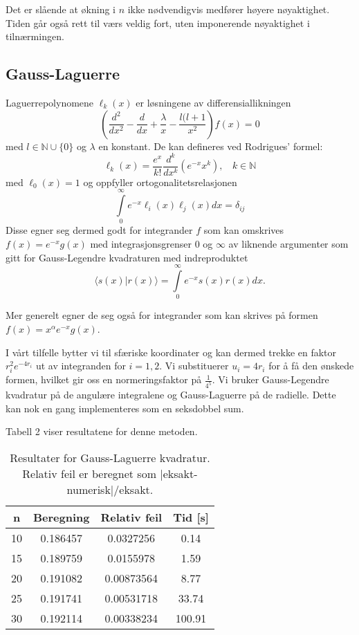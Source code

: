 \documentclass[norsk, 12pt]{article}
\newcommand{\f}{\frac}
\begin{document}
Det er slående at økning i $n$ ikke nødvendigvis medfører høyere nøyaktighet. Tiden går også rett til værs veldig fort,
uten imponerende nøyaktighet i tilnærmingen.

\subsection{Gauss-Laguerre}
Laguerrepolynomene $\ell_k(x)$ er løsningene av differensiallikningen
$$\left(\f{d^2}{dx^2}-\f{d}{dx}+\f{\lambda}{x}-\f{l(l+1}{x^2}\right)f(x)=0$$
med $l\in\mathbb{N}\cup\{0\}$ og $\lambda$ en konstant.
De kan defineres ved Rodrigues' formel:
$$\ell_k(x)=\f{e^x}{k!}\f{d^k}{dx^k}\left(e^{-x}x^k\right),\ \ \ \ k\in \mathbb{N}$$
med $\ell_0(x) =1$ og oppfyller ortogonalitetsrelasjonen
$$\int\limits_0^\infty e^{-x}\ell_i(x)\ell_j(x)dx = \delta_{ij}$$
Disse egner seg dermed godt for integrander $f$ som kan omskrives $f(x) = e^{-x}g(x)$ med integrasjonsgrenser
$0$ og $\infty$ av liknende argumenter som gitt for Gauss-Legendre kvadraturen med indreproduktet
$$\langle s(x)|r(x)\rangle = \int\limits_0^\infty e^{-x}s(x)r(x)dx.$$

Mer generelt egner de seg også for integrander som kan skrives på formen $f(x) = x^\alpha e^{-x}g(x)$.

I vårt tilfelle bytter vi til sfæriske koordinater og kan dermed trekke en faktor $r_i^2e^{-4r_i}$ ut av integranden for $i=1,2$.
Vi substituerer $u_i = 4r_i$ for å få den ønskede formen, hvilket gir oss en normeringsfaktor på $\f{1}{4^5}$.
Vi bruker Gauss-Legendre kvadratur på de angulære integralene og Gauss-Laguerre på de radielle. Dette kan nok en gang
implementeres som en seksdobbel sum.

Tabell 2 viser resultatene for denne metoden.


\begin{table}[h!]
 \centering
 \begin{tabular}{|c|c|c|c|}\hline
 n &Beregning &Relativ feil &Tid [s] \\ \hline
 10      &0.186457      &0.0327256      &0.14\\
 15      &0.189759      &0.0155978      &1.59\\
 20      &0.191082      &0.00873564      &8.77\\
 25      &0.191741      &0.00531718      &33.74\\
 30      &0.192114      &0.00338234      &100.91\\ \hline
  
 \end{tabular}
\caption{Resultater for Gauss-Laguerre kvadratur. Relativ feil er beregnet som |eksakt-numerisk|/eksakt.}
\end{table}
\end{document}
